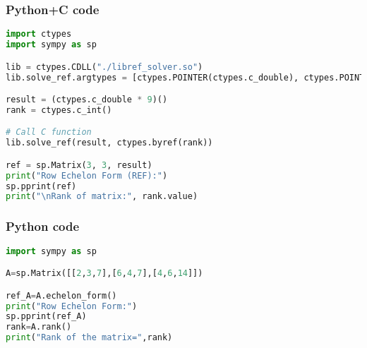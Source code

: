 \documentclass{beamer}
\begin{document}
\begin{frame}[fragile]
    \frametitle{Python+C code}

    \begin{lstlisting}[language=Python]
import ctypes
import sympy as sp

lib = ctypes.CDLL("./libref_solver.so")
lib.solve_ref.argtypes = [ctypes.POINTER(ctypes.c_double), ctypes.POINTER(ctypes.c_int)]

result = (ctypes.c_double * 9)()
rank = ctypes.c_int()

# Call C function
lib.solve_ref(result, ctypes.byref(rank))

ref = sp.Matrix(3, 3, result)
print("Row Echelon Form (REF):")
sp.pprint(ref)
print("\nRank of matrix:", rank.value)
    \end{lstlisting}
\end{frame}

\begin{frame}[fragile]
    \frametitle{Python code}
    \begin{lstlisting}[language=Python]
import sympy as sp

A=sp.Matrix([[2,3,7],[6,4,7],[4,6,14]])

ref_A=A.echelon_form()
print("Row Echelon Form:")
sp.pprint(ref_A)
rank=A.rank()
print("Rank of the matrix=",rank)
    \end{lstlisting}   
\end{frame}
\end{document}
